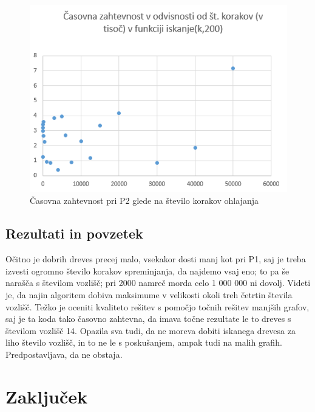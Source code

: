 \documentclass[a4paper, 12 pt]{article}
\begin{document}
\begin{figure}[H]
\centering
  \includegraphics[width=12cm]{casovna_p2_korak.png}
  \caption{Časovna zahtevnost pri P2 glede na število korakov ohlajanja}
  \label{fig:p2_časovna_zaht_korak} 
\end{figure}


\subsection{Rezultati in povzetek}

Očitno je dobrih dreves precej malo, vsekakor dosti manj kot pri P1, saj je treba izvesti ogromno število korakov spreminjanja, da najdemo vsaj eno; to pa še narašča s številom vozlišč; pri 2000 namreč morda celo 1 000 000 ni dovolj. Videti je, da najin algoritem dobiva maksimume v velikosti okoli treh četrtin števila vozlišč. Težko je oceniti kvaliteto rešitev s pomočjo točnih rešitev manjših grafov, saj je ta koda tako časovno zahtevna, da imava točne rezultate le to dreves s številom vozlišč 14. Opazila sva tudi, da ne moreva dobiti iskanega drevesa za liho število vozlišč, in to ne le s poskušanjem, ampak tudi na malih grafih. Predpostavljava, da ne obstaja.

\section{Zaključek}
\end{document}
